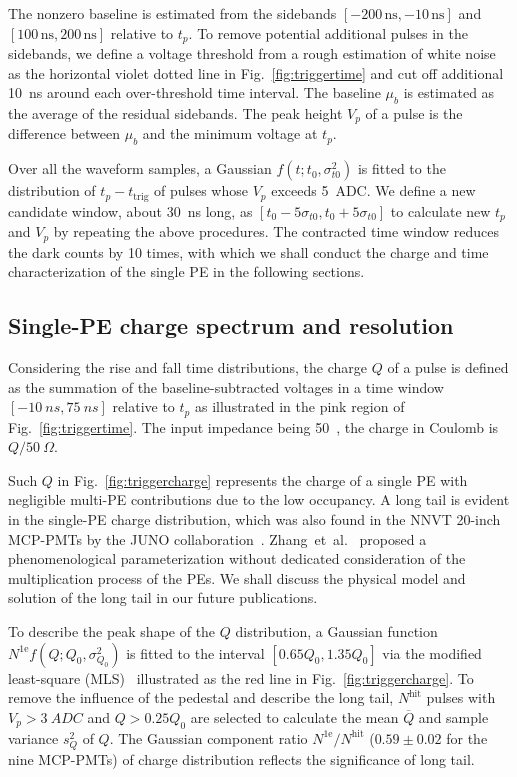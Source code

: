 The nonzero baseline is estimated from the sidebands $[-200\,\mathrm{ns},-10\,\mathrm{ns}]$ and $[100\,\mathrm{ns},200\,\mathrm{ns}]$ relative to $t_p$. %
To remove potential additional pulses in the sidebands, we define a voltage threshold from a rough estimation of white noise as the horizontal violet dotted line in Fig.~\ref{fig:triggertime} and cut off additional \SI{10}{ns} around each over-threshold time interval. The baseline $\mu_b$ is estimated as the average of the residual sidebands. The peak height $V_p$ of a pulse is the difference between $\mu_b$ and the minimum voltage at \(t_p\).

Over all the waveform samples, a Gaussian $f(t;t_0,\sigma_{t0}^2)$ is fitted to the distribution of $t_p-t_{\mathrm{trig}}$ of pulses whose $V_p$ exceeds \SI{5}{ADC}. We define a new candidate window, about \SI{30}{ns} long, as $[t_0-5\sigma_{t0}, t_0+5\sigma_{t0}]$ to calculate new $t_p$ and $V_p$ by repeating the above procedures.  The contracted time window reduces the dark counts by 10 times, with which we shall conduct the charge and time characterization of the single PE in the following sections.

\subsection{Single-PE charge spectrum and resolution}
\label{sec:noisepeak}

Considering the rise and fall time distributions, the charge $Q$ of a pulse is defined as %
the summation of the baseline-subtracted voltages in a time window $[\SI{-10}{ns}, \SI{75}{ns}]$ relative to $t_p$ as illustrated in the pink region of Fig.~\ref{fig:triggertime}. The input impedance being \SI{50}{\Omega}~\cite{CAENV1751}, the charge in Coulomb is $Q/\SI{50}{\Omega}$.

Such $Q$ in Fig.~\ref{fig:triggercharge} represents the charge of a single PE with negligible multi-PE contributions due to the low occupancy. A long tail is evident in the single-PE charge distribution, which was also found in the NNVT 20-inch MCP-PMTs by the JUNO collaboration~\cite{JUNOMassTesting}. Zhang~et~al.~\cite{JUNOLongtail} proposed a phenomenological parameterization without dedicated consideration of the multiplication process of the PEs. We shall discuss the physical model and solution of the long tail in our future publications.

To describe the peak shape of the $Q$ distribution, a Gaussian function $N^{\mathrm{1e}}f(Q;Q_0,\sigma^2_{Q_0})$ is fitted to the interval $[0.65Q_0, 1.35Q_0]$ via the modified least-square (MLS)~\cite{Cowan1998StatisticalDA} illustrated as the red line in Fig.~\ref{fig:triggercharge}. To remove the influence of the pedestal and describe the long tail, $N^{\mathrm{hit}}$ pulses with $V_p>\SI{3}{ADC}$ and $Q>0.25Q_0$ are selected to calculate the mean $\overline{Q}$ and sample variance $s^2_{Q}$ of $Q$. The Gaussian component ratio $N^{\mathrm{1e}}/N^{\mathrm{hit}}$ ($0.59\pm0.02$ for the nine MCP-PMTs) of charge distribution reflects the significance of long tail.

